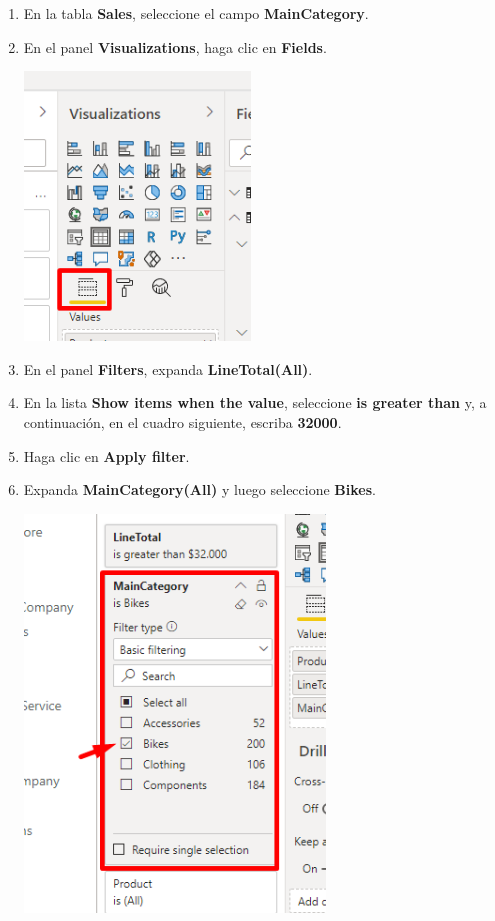 \documentclass[12pt,letterpaper]{article}
\newcommand\tab[1][1cm]{\hspace*{#1}}
\begin{document}
\begin{enumerate}[\tab 1.]
        \item En la tabla \textbf{Sales}, seleccione el campo \textbf{MainCategory}.
        \item En el panel \textbf{Visualizations}, haga clic en \textbf{Fields}.
        \begin{center}
            \includegraphics[width=6cm]{./img/img106.png}
        \end{center}
        \item En el panel \textbf{Filters}, expanda \textbf{LineTotal(All)}.
        \item En la lista \textbf{Show items when the value}, seleccione \textbf{is greater than} y, a continuación, en el cuadro siguiente, escriba \textbf{32000}.
        \item Haga clic en \textbf{Apply filter}.
        \item Expanda \textbf{MainCategory(All)} y luego seleccione \textbf{Bikes}.
        \begin{center}
            \includegraphics[width=8cm]{./img/img110.png}

\end{center}
\end{enumerate}
\end{document}
